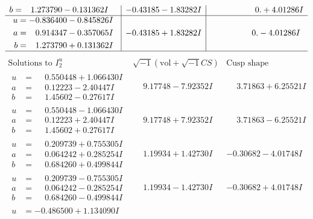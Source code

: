 \documentclass[1p]{elsarticle_modified}
\theoremstyle{definition}
\newcommand{\I}{\sqrt{-1}}
\begin{document}
$$\begin{array}{c|c|c}
\begin{aligned}
b &= \phantom{-}1.273790 - 0.131362 I\end{aligned}
 & -0.43185 - 1.83282 I & \phantom{-0.000000 -}0. + 4.01286 I \\ \hline\begin{aligned}
u &= -0.836400 - 0.845826 I \\
a &= \phantom{-}0.914347 - 0.357065 I \\
b &= \phantom{-}1.273790 + 0.131362 I\end{aligned}
 & -0.43185 + 1.83282 I & \phantom{-0.000000 } 0. - 4.01286 I\\
 \hline 
 \end{array}$$\newpage$$\begin{array}{c|c|c}  
\text{Solutions to }I^u_{2}& \I (\text{vol} + \sqrt{-1}CS) & \text{Cusp shape}\\
 \hline 
\begin{aligned}
u &= \phantom{-}0.550448 + 1.066430 I \\
a &= \phantom{-}0.12223 - 2.40447 I \\
b &= \phantom{-}1.45602 - 0.27617 I\end{aligned}
 & \phantom{-}9.17748 - 7.92352 I & \phantom{-}3.71863 + 6.25521 I \\ \hline\begin{aligned}
u &= \phantom{-}0.550448 - 1.066430 I \\
a &= \phantom{-}0.12223 + 2.40447 I \\
b &= \phantom{-}1.45602 + 0.27617 I\end{aligned}
 & \phantom{-}9.17748 + 7.92352 I & \phantom{-}3.71863 - 6.25521 I \\ \hline\begin{aligned}
u &= \phantom{-}0.209739 + 0.755305 I \\
a &= \phantom{-}0.064242 + 0.285254 I \\
b &= \phantom{-}0.684260 + 0.499844 I\end{aligned}
 & \phantom{-}1.19934 + 1.42730 I & -0.30682 - 4.01748 I \\ \hline\begin{aligned}
u &= \phantom{-}0.209739 - 0.755305 I \\
a &= \phantom{-}0.064242 - 0.285254 I \\
b &= \phantom{-}0.684260 - 0.499844 I\end{aligned}
 & \phantom{-}1.19934 - 1.42730 I & -0.30682 + 4.01748 I \\ \hline\begin{aligned}
u &= -0.486500 + 1.134090 I \\

\end{aligned}
\end{array}$$
\end{document}
